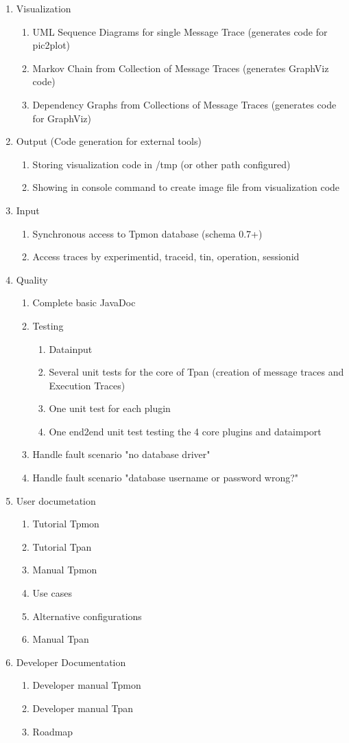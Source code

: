 \documentclass{scrartcl}
\begin{document}
\begin{enumerate}
\item Visualization
\begin{enumerate}
 \item UML Sequence Diagrams for single Message Trace (generates code for pic2plot)
\item Markov Chain from Collection of Message Traces (generates GraphViz code)
\item Dependency Graphs from Collections of Message Traces (generates code for GraphViz)
\end{enumerate}
\item Output (Code generation for external tools)
\begin{enumerate}
 \item Storing visualization code in /tmp (or other path configured)
\item Showing in console command to create image file from visualization code
\end{enumerate}
\item Input
\begin{enumerate}
\item Synchronous access to Tpmon database (schema 0.7+)
\item Access traces by experimentid, traceid, tin, operation, sessionid
\end{enumerate}
\item Quality
\begin{enumerate}
 \item Complete basic JavaDoc
\item Testing
\begin{enumerate}
 \item Datainput
\item Several unit tests for the core of Tpan (creation of message traces and Execution Traces)
\item One unit test for each plugin
\item One end2end unit test testing the 4 core plugins and dataimport
\end{enumerate}
\item Handle fault scenario "no database driver"
\item Handle fault scenario "database username or password wrong?"
\end{enumerate}
\item User documetation
\begin{enumerate}
 \item Tutorial Tpmon
\item Tutorial Tpan
\item Manual Tpmon
\item Use cases
\item Alternative configurations
\item Manual Tpan
\end{enumerate}

\item Developer Documentation
\begin{enumerate}
\item Developer manual Tpmon
\item Developer manual Tpan
\item Roadmap
\end{enumerate}
\end{enumerate}
\end{document}
